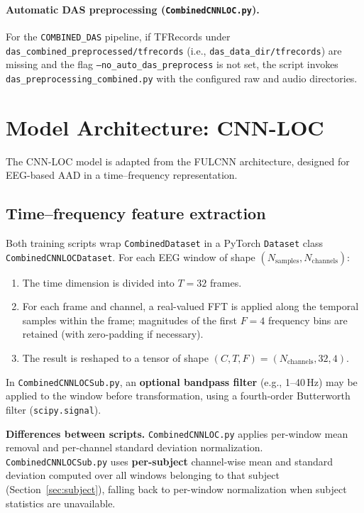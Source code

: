 \documentclass[11pt,a4paper]{article}
\newcommand{\py}[1]{\texttt{#1}}
\begin{document}
\paragraph{Automatic DAS preprocessing (\py{CombinedCNNLOC.py}).} For the \texttt{COMBINED\_DAS} pipeline, if TFRecords under \py{das\_combined\_preprocessed/tfrecords} (i.e., \texttt{das\_data\_dir/tfrecords}) are missing and the flag \texttt{--no\_auto\_das\_preprocess} is not set, the script invokes \py{das\_preprocessing\_combined.py} with the configured raw and audio directories.

\section{Model Architecture: CNN-LOC}
\label{sec:model}

The CNN-LOC model is adapted from the FULCNN architecture, designed for EEG-based AAD in a time--frequency representation.

\subsection{Time--frequency feature extraction}
\label{sec:tf}

Both training scripts wrap \py{CombinedDataset} in a PyTorch \texttt{Dataset} class \py{CombinedCNNLOCDataset}. For each EEG window of shape $(N_{\text{samples}}, N_{\text{channels}})$:
\begin{enumerate}
  \item The time dimension is divided into $T = 32$ frames.
  \item For each frame and channel, a real-valued FFT is applied along the temporal samples within the frame; magnitudes of the first $F = 4$ frequency bins are retained (with zero-padding if necessary).
  \item The result is reshaped to a tensor of shape $(C, T, F) = (N_{\text{channels}}, 32, 4)$.
\end{enumerate}

In \py{CombinedCNNLOCSub.py}, an \textbf{optional bandpass filter} (e.g., 1--40\,Hz) may be applied to the window before transformation, using a fourth-order Butterworth filter (\texttt{scipy.signal}).

\textbf{Differences between scripts.} \py{CombinedCNNLOC.py} applies per-window mean removal and per-channel standard deviation normalization. \py{CombinedCNNLOCSub.py} uses \textbf{per-subject} channel-wise mean and standard deviation computed over all windows belonging to that subject (Section~\ref{sec:subject}), falling back to per-window normalization when subject statistics are unavailable.
\end{document}
